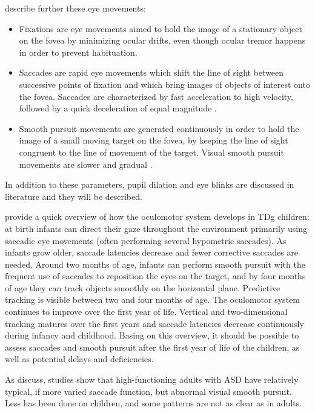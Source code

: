 \citet[pp. 2, 170, 290]{leigh2015neurology} describe further these eye movements:
\begin{itemize}
    \item Fixations are eye movements aimed to hold the image of a stationary object on the fovea by minimizing ocular drifts, even though ocular tremor happens in order to prevent habituation.
    \item Saccades are rapid eye movements which shift the line of sight between successive points of fixation and which bring images of objects of interest onto the fovea. Saccades are characterized by fast acceleration to high velocity, followed by a quick deceleration of equal magnitude \citep{wilkes2015oculomotor}.
    \item Smooth pursuit movements are generated continuously in order to hold the image of a small moving target on the fovea, by keeping the line of sight congruent to the line of movement of the target. Visual smooth pursuit movements are slower and gradual \citep{wilkes2015oculomotor}.
\end{itemize}
In addition to these parameters, pupil dilation and eye blinks are discussed in literature and they will be described.

\cite{falck-ytter2013eyetrackingASD} provide a quick overview of how the oculomotor system develops in TDg children: at birth infants can direct their gaze throughout the environment primarily using saccadic eye movements (often performing several hypometric saccades). As infants grow older, saccade latencies decrease and fewer corrective saccades are needed. Around two months of age, infants can perform smooth pursuit with the frequent use of saccades to reposition the eyes on the target, and by four months of age they can track objects smoothly on the horizontal plane. Predictive tracking is visible between two and four months of age. The oculomotor system continues to improve over the first year of life. Vertical and two-dimensional tracking matures over the first years and saccade latencies decrease continuously during infancy and childhood. Basing on this overview, it should be possible to assess saccades and smooth pursuit after the first year of life of the children, as well as potential delays and deficiencies.

As \cite{wilkes2015oculomotor} discuss, studies show that high-functioning adults with ASD have relatively typical, if more varied saccade function, but abnormal visual smooth pursuit. Less has been done on children, and some patterns are not as clear as in adults.

